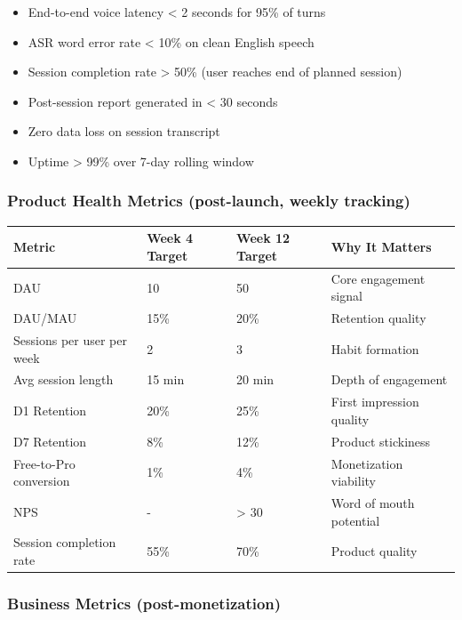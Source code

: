 \documentclass[
  11pt,
]{article}
\providecommand{\tightlist}{%
  \setlength{\itemsep}{0pt}\setlength{\parskip}{0pt}}
\begin{document}
\begin{itemize}
\tightlist
\item[$\square$]
  End-to-end voice latency \textless{} 2 seconds for 95\% of turns
\item[$\square$]
  ASR word error rate \textless{} 10\% on clean English speech
\item[$\square$]
  Session completion rate \textgreater{} 50\% (user reaches end of
  planned session)
\item[$\square$]
  Post-session report generated in \textless{} 30 seconds
\item[$\square$]
  Zero data loss on session transcript
\item[$\square$]
  Uptime \textgreater{} 99\% over 7-day rolling window
\end{itemize}

\hypertarget{product-health-metrics-post-launch-weekly-tracking}{%
\subsubsection{Product Health Metrics (post-launch, weekly
tracking)}\label{product-health-metrics-post-launch-weekly-tracking}}

\begin{longtable}[]{@{}llll@{}}
\toprule\noalign{}
Metric & Week 4 Target & Week 12 Target & Why It Matters \\
\midrule\noalign{}
\endhead
\bottomrule\noalign{}
\endlastfoot
DAU & 10 & 50 & Core engagement signal \\
DAU/MAU & 15\% & 20\% & Retention quality \\
Sessions per user per week & 2 & 3 & Habit formation \\
Avg session length & 15 min & 20 min & Depth of engagement \\
D1 Retention & 20\% & 25\% & First impression quality \\
D7 Retention & 8\% & 12\% & Product stickiness \\
Free-to-Pro conversion & 1\% & 4\% & Monetization viability \\
NPS & - & \textgreater{} 30 & Word of mouth potential \\
Session completion rate & 55\% & 70\% & Product quality \\
\end{longtable}

\hypertarget{business-metrics-post-monetization}{%
\subsubsection{Business Metrics
(post-monetization)}\label{business-metrics-post-monetization}}
\end{document}
